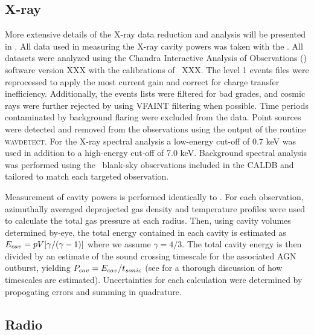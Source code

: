 \documentclass{emulateapj}
\begin{document}
\subsection{X-ray}
\label{sec:xray}

More extensive details of the X-ray data reduction and analysis will
be presented in \citet{nulsen09}. All data used in measuring the X-ray
cavity powers was taken with the \cxo. All datasets were analyzed
using the Chandra Interactive Analysis of Observations (\ciao)
software version XXX with the calibrations of \caldb\ XXX. The level 1
events files were reprocessed to apply the most current gain and
correct for charge transfer inefficiency. Additionally, the events
lists were filtered for bad grades, and cosmic rays were further
rejected by using VFAINT filtering when possible. Time periods
contaminated by background flaring were excluded from the data. Point
sources were detected and removed from the observations using the
output of the routine {\textsc{wavdetect}}. For the X-ray spectral
analysis a low-energy cut-off of 0.7 keV was used in addition to a
high-energy cut-off of 7.0 keV. Background spectral analysis was
performed using the \caldb\ blank-sky observations included in the
CALDB and tailored to match each targeted observation.

Measurement of cavity powers is performed identically to
\citet{rafferty06}. For each observation, azimuthally averaged
deprojected gas density and temperature profiles were used to
calculate the total gas pressure at each radius. Then, using cavity
volumes determined by-eye, the total energy contained in each cavity
is estimated as $E_{cav} = pV[\gamma/(\gamma-1)]$ where we assume
$\gamma = 4/3$. The total cavity energy is then divided by an estimate
of the sound crossing timescale for the associated AGN outburst,
yielding $P_{cav} = E_{cav}/t_{sonic}$ (see \citet{mcnamrev} for a
thorough discussion of how timescales are estimated). Uncertainties
for each calculation were determined by propogating errors and summing
in quadrature.

\subsection{Radio}
\label{sec:radio}

\end{document}
